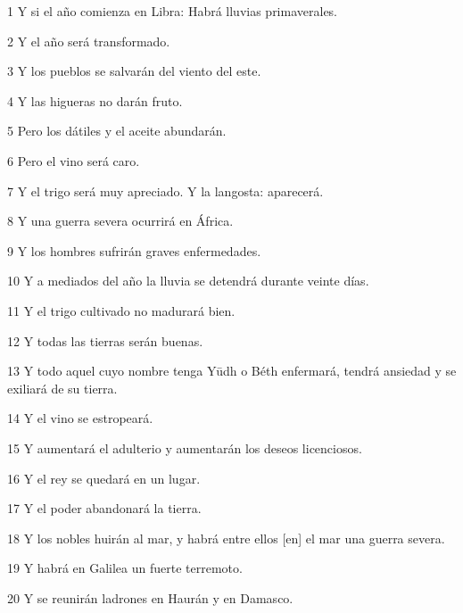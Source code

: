 \par 1 Y si el año comienza en Libra: Habrá lluvias primaverales.

\par 2 Y el año será transformado.

\par 3 Y los pueblos se salvarán del viento del este.

\par 4 Y las higueras no darán fruto.

\par 5 Pero los dátiles y el aceite abundarán.

\par 6 Pero el vino será caro.

\par 7 Y el trigo será muy apreciado. Y la langosta: aparecerá.

\par 8 Y una guerra severa ocurrirá en África.

\par 9 Y los hombres sufrirán graves enfermedades.

\par 10 Y a mediados del año la lluvia se detendrá durante veinte días.

\par 11 Y el trigo cultivado no madurará bien.

\par 12 Y todas las tierras serán buenas.

\par 13 Y todo aquel cuyo nombre tenga Yūdh o Béth enfermará, tendrá ansiedad y se exiliará de su tierra.

\par 14 Y el vino se estropeará.

\par 15 Y aumentará el adulterio y aumentarán los deseos licenciosos.

\par 16 Y el rey se quedará en un lugar.

\par 17 Y el poder abandonará la tierra.

\par 18 Y los nobles huirán al mar, y habrá entre ellos [en] el {mar} una guerra severa.

\par 19 Y habrá en Galilea un fuerte terremoto.

\par 20 Y se reunirán ladrones en Haurán y en Damasco.

